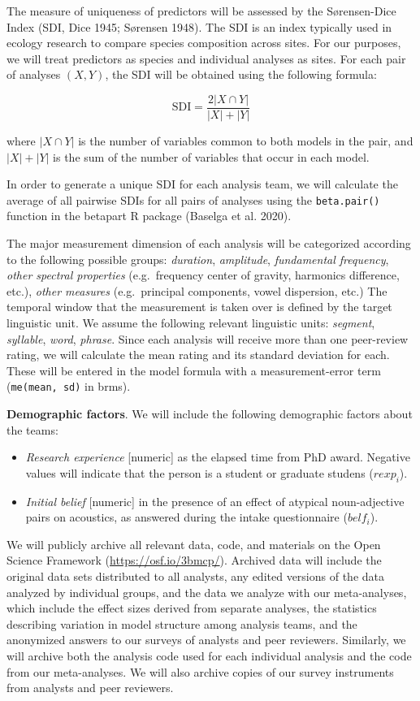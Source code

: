 \documentclass[
  12pt,
]{article}
\providecommand{\tightlist}{%
  \setlength{\itemsep}{0pt}\setlength{\parskip}{0pt}}
\begin{document}
The measure of uniqueness of predictors will be assessed by the Sørensen-Dice Index (SDI, Dice 1945; Sørensen 1948).
The SDI is an index typically used in ecology research to compare species composition across sites.
For our purposes, we will treat predictors as species and individual analyses as sites.
For each pair of analyses \((X, Y)\), the SDI will be obtained using the following formula:

\[\text{SDI} = \frac{2|X \cap Y|}{|X|+|Y|}\]

where \(|X \cap Y|\) is the number of variables common to both models in the pair, and \(|X|+|Y|\) is the sum of the number of variables that occur in each model.

In order to generate a unique SDI for each analysis team, we will calculate the average of all pairwise SDIs for all pairs of analyses using the \texttt{beta.pair()} function in the betapart R package (Baselga et al. 2020).

The major measurement dimension of each analysis will be categorized according to the following possible groups: \emph{duration}, \emph{amplitude}, \emph{fundamental frequency}, \emph{other spectral properties} (e.g.~frequency center of gravity, harmonics difference, etc.), \emph{other measures} (e.g.~principal components, vowel dispersion, etc.)
The temporal window that the measurement is taken over is defined by the target linguistic unit.
We assume the following relevant linguistic units: \emph{segment}, \emph{syllable}, \emph{word}, \emph{phrase}.
Since each analysis will receive more than one peer-review rating, we will calculate the mean rating and its standard deviation for each.
These will be entered in the model formula with a measurement-error term (\texttt{me(mean,\ sd)} in brms).

\textbf{Demographic factors}. We will include the following demographic factors about the teams:

\begin{itemize}
\tightlist
\item
  \emph{Research experience} {[}numeric{]} as the elapsed time from PhD award. Negative values will indicate that the person is a student or graduate studens (\(rexp_i\)).
\item
  \emph{Initial belief} {[}numeric{]} in the presence of an effect of atypical noun-adjective pairs on acoustics, as answered during the intake questionnaire (\(belf_i\)).
\end{itemize}

We will publicly archive all relevant data, code, and materials on the Open Science Framework (\url{https://osf.io/3bmcp/}).
Archived data will include the original data sets distributed to all analysts, any edited versions of the data analyzed by individual groups, and the data we analyze with our meta-analyses, which include the effect sizes derived from separate analyses, the statistics describing variation in model structure among analysis teams, and the anonymized answers to our surveys of analysts and peer reviewers.
Similarly, we will archive both the analysis code used for each individual analysis and the code from our meta-analyses.
We will also archive copies of our survey instruments from analysts and peer reviewers.
\end{document}
